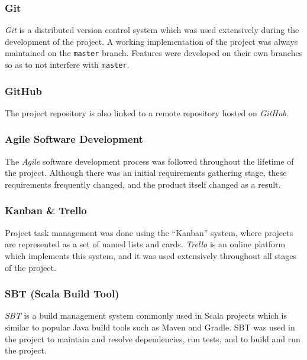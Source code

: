 \documentclass{l4proj}
\newcommand{\code}[1]{\texttt{#1}}
\begin{document}
             \subsubsection{Git}
         \textit{Git} is a distributed version control system which was used extensively during the development of the project. A working implementation of the project was always maintained on the \code{master} branch. Features were developed on their own branches so as to not interfere with \code{master}.
         
             \subsubsection{GitHub}
             The project repository is also linked to a remote repository hosted on \textit{GitHub}.
             
             \subsubsection{Agile Software Development}
             The \textit{Agile} software development process was followed throughout the lifetime of the project. Although there was an initial requirements gathering stage, these requirements frequently changed, and the product itself changed as a result.
             
             
             \subsubsection{Kanban \& Trello}
             Project task management was done using the ``Kanban'' system, where projects are represented as a set of named lists and cards. \textit{Trello} is an online platform which implements this system, and it was used extensively throughout all stages of the project.
         
             \subsubsection{SBT (Scala Build Tool)}
         \textit{SBT} is a build management system commonly used in Scala projects which is similar to popular Java build tools such as Maven and Gradle. SBT was used in the project to maintain and resolve dependencies, run tests, and to build and run the project.

    
    
\end{document}
